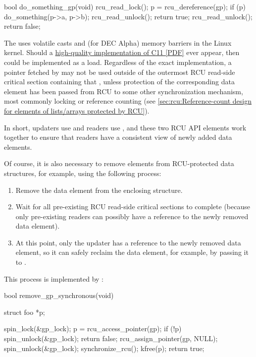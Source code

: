 \begin{fcvlabel}
\begin{VerbatimN}[commandchars=\%\@\$]
	bool do_something_gp(void)
	{
		rcu_read_lock();
		p = rcu_dereference(gp);
		if (p) {
			do_something(p->a, p->b);
			rcu_read_unlock();    %
			return true;
		}
		rcu_read_unlock();
		return false;
	}
\end{VerbatimN}
\end{fcvlabel}

The  uses volatile casts and (for DEC Alpha) memory
barriers in the Linux kernel.
Should a
\href{http://www.rdrop.com/users/paulmck/RCU/consume.2015.07.13a.pdf}
{high-quality implementation of C11  [PDF]}
ever appear, then  could be implemented as a
 load. Regardless of the exact implementation, a
pointer fetched by  may not be used outside of the
outermost RCU read-side critical section containing that
, unless protection of the corresponding data
element has been passed from RCU to some other synchronization
mechanism, most commonly locking or reference counting
(see \cref{sec:rcu:Reference-count design for elements of lists/arrays protected by RCU}).

In short, updaters use  and readers use
, and these two RCU API elements work together to
ensure that readers have a consistent view of newly added data elements.

Of course, it is also necessary to remove elements from RCU-protected
data structures, for example, using the following process:

\begin{enumerate}
\item Remove the data element from the enclosing structure.
\item Wait for all pre-existing RCU read-side critical sections to complete
   (because only pre-existing readers can possibly have a reference to
   the newly removed data element).
\item At this point, only the updater has a reference to the newly removed
   data element, so it can safely reclaim the data element, for example,
   by passing it to .
\end{enumerate}

This process is implemented by :

\begin{fcvlabel}
\begin{VerbatimN}[commandchars=\%\@\$]
	bool remove_gp_synchronous(void)
	{
		struct foo *p;

		spin_lock(&gp_lock);
		p = rcu_access_pointer(gp);  %
		if (!p) {
			spin_unlock(&gp_lock);
			return false;
		}
		rcu_assign_pointer(gp, NULL);  %
		spin_unlock(&gp_lock);
		synchronize_rcu();    %
		kfree(p);             %
		return true;
	}
\end{VerbatimN}
\end{fcvlabel}

